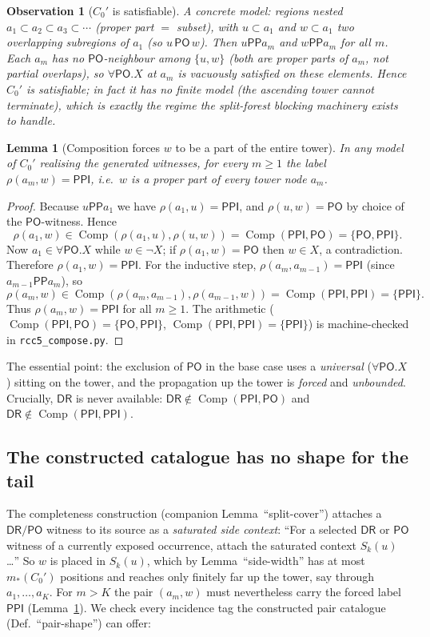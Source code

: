 \documentclass[11pt]{article}
\newtheorem{lemma}[theorem]{Lemma}
\newtheorem{observation}[theorem]{Observation}
\newcommand{\DR}{\mathsf{DR}}
\newcommand{\PO}{\mathsf{PO}}
\newcommand{\PP}{\mathsf{PP}}
\newcommand{\PPI}{\mathsf{PPI}}
\newcommand{\comp}{\operatorname{Comp}}
\begin{document}
\begin{observation}[$C_0'$ is satisfiable]
A concrete model: regions nested $a_1\subset a_2\subset a_3\subset\cdots$
(proper part $=$ subset), with $u\subset a_1$ and $w\subset a_1$ two
\emph{overlapping} subregions of $a_1$ (so $u\,\PO\,w$).  Then $u\PP a_m$ and
$w\PP a_m$ for all $m$.  Each $a_m$ has no $\PO$-neighbour among $\{u,w\}$ (both
are proper parts of $a_m$, not partial overlaps), so $\forall\PO.X$ at $a_m$ is
vacuously satisfied on these elements.  Hence $C_0'$ is satisfiable; in fact it
has no finite model (the ascending tower cannot terminate), which is exactly the
regime the split-forest blocking machinery exists to handle.
\end{observation}

\begin{lemma}[Composition forces $w$ to be a part of the entire tower]
\label{lem:forced}
In any model of $C_0'$ realising the generated witnesses, for every $m\ge1$ the
label $\rho(a_m,w)=\PPI$, i.e.\ $w$ is a proper part of every tower node $a_m$.
\end{lemma}

\begin{proof}
Because $u\PP a_1$ we have $\rho(a_1,u)=\PPI$, and $\rho(u,w)=\PO$ by choice of
the $\PO$-witness.  Hence
\[
  \rho(a_1,w)\in\comp(\rho(a_1,u),\rho(u,w))=\comp(\PPI,\PO)=\{\PO,\PPI\}.
\]
Now $a_1\in\forall\PO.X$ while $w\in\neg X$; if $\rho(a_1,w)=\PO$ then $w\in X$,
a contradiction.  Therefore $\rho(a_1,w)=\PPI$.  For the inductive step,
$\rho(a_{m},a_{m-1})=\PPI$ (since $a_{m-1}\PP a_m$), so
\[
  \rho(a_m,w)\in\comp(\rho(a_m,a_{m-1}),\rho(a_{m-1},w))
            =\comp(\PPI,\PPI)=\{\PPI\}.
\]
Thus $\rho(a_m,w)=\PPI$ for all $m\ge1$.  The arithmetic
($\comp(\PPI,\PO)=\{\PO,\PPI\}$, $\comp(\PPI,\PPI)=\{\PPI\}$) is machine-checked
in \texttt{rcc5\_compose.py}.
\end{proof}

The essential point: the exclusion of $\PO$ in the base case uses a
\emph{universal} ($\forall\PO.X$) sitting on the tower, and the propagation up
the tower is \emph{forced} and \emph{unbounded}.  Crucially, $\DR$ is never
available: $\DR\notin\comp(\PPI,\PO)$ and $\DR\notin\comp(\PPI,\PPI)$.

\subsection{The constructed catalogue has no shape for the tail}

The completeness construction (companion Lemma~``split-cover'') attaches a
$\DR/\PO$ witness to its source as a \emph{saturated side context}: ``For a
selected $\DR$ or $\PO$ witness of a currently exposed occurrence, attach the
saturated context $S_k(u)$\ldots''  So $w$ is placed in $S_k(u)$, which by
Lemma~``side-width'' has at most $m_*(C_0')$ positions and reaches only finitely
far up the tower, say through $a_1,\dots,a_K$.  For $m>K$ the pair $(a_m,w)$ must
nevertheless carry the forced label $\PPI$ (Lemma~\ref{lem:forced}).  We check
every incidence tag the constructed pair catalogue (Def.~``pair-shape'') can
offer:
\end{document}
